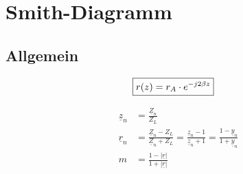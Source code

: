 \section{Smith-Diagramm}

\subsection{Allgemein}
\begin{center}
    \begin{align*}
        \Aboxed{r(z) & = r_A \cdot e^{-j2\beta z}}
    \end{align*}
    
\end{center}
\begin{align*}
    \underline{z}_n & = \frac{\underline{Z}_n}{Z_L}                                                                                                                   \\
    \underline{r}_n & = \frac{\underline{Z}_n-Z_L}{\underline{Z}_n+Z_L}= \frac{\underline{z}_n-1}{\underline{z}_n+1}    = \frac{1-\underline{y}_n}{1+\underline{y}_n} \\
    m               & = \frac{1-|\underline{r}|}{1+|\underline{r}|}
\end{align*}
